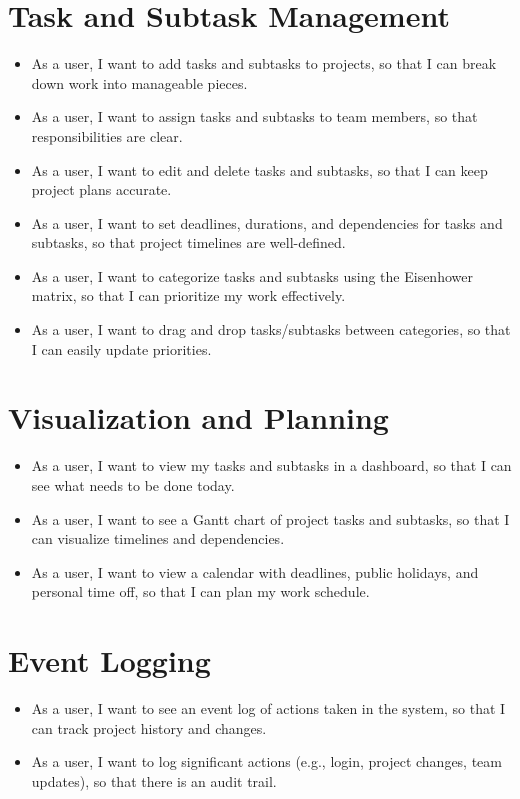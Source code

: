 \documentclass{article}
\begin{document}
\section{Task and Subtask Management}
\begin{itemize}[leftmargin=*, label=--]
    \item As a user, I want to add tasks and subtasks to projects, so that I can break down work into manageable pieces.
    \item As a user, I want to assign tasks and subtasks to team members, so that responsibilities are clear.
    \item As a user, I want to edit and delete tasks and subtasks, so that I can keep project plans accurate.
    \item As a user, I want to set deadlines, durations, and dependencies for tasks and subtasks, so that project timelines are well-defined.
    \item As a user, I want to categorize tasks and subtasks using the Eisenhower matrix, so that I can prioritize my work effectively.
    \item As a user, I want to drag and drop tasks/subtasks between categories, so that I can easily update priorities.
\end{itemize}

\section{Visualization and Planning}
\begin{itemize}[leftmargin=*, label=--]
    \item As a user, I want to view my tasks and subtasks in a dashboard, so that I can see what needs to be done today.
    \item As a user, I want to see a Gantt chart of project tasks and subtasks, so that I can visualize timelines and dependencies.
    \item As a user, I want to view a calendar with deadlines, public holidays, and personal time off, so that I can plan my work schedule.
\end{itemize}

\section{Event Logging}
\begin{itemize}[leftmargin=*, label=--]
    \item As a user, I want to see an event log of actions taken in the system, so that I can track project history and changes.
    \item As a user, I want to log significant actions (e.g., login, project changes, team updates), so that there is an audit trail.
\end{itemize}
\end{document}
